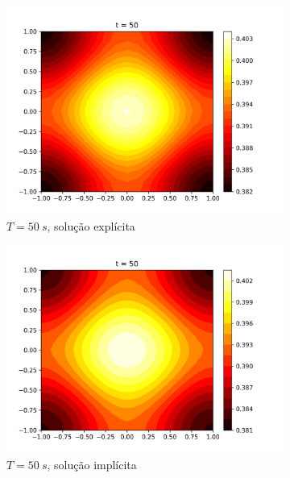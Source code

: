 \documentclass{article}
\begin{document}
\begin{figure}
\begin{subfigure}[b]{0.49\textwidth}
         \centering
         \includegraphics[width=\textwidth]{figs/q7a_heatmap_t50.png}
         \caption{$T=50~s$, solução explícita}
	\label{fig:q7a_heatmap_t50}
     \end{subfigure}
     \hfill
     \begin{subfigure}[b]{0.49\textwidth}
         \centering
     \includegraphics[width=\textwidth]{figs/q7b_heatmap_t50.png}
         \caption{$T=50~s$, solução implícita}
	\label{fig:q7b_heatmap_t50}
     \end{subfigure}
     \begin{subfigure}[b]{0.49\textwidth}
         \centering

\end{subfigure}
\end{figure}
\end{document}

